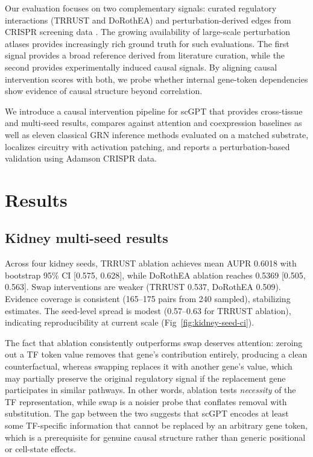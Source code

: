 \documentclass[10pt,letterpaper]{article}
\begin{document}
Our evaluation focuses on two complementary signals: curated regulatory
interactions (TRRUST and DoRothEA) and perturbation-derived edges from CRISPR
screening data \cite{dixit_perturbseq_2016,datlinger_perturbseq_2017}. The
growing availability of large-scale perturbation atlases
\cite{replogle_perturbseq_2022,norman_crispr_2019} provides increasingly rich
ground truth for such evaluations. The first signal provides a broad reference
derived from literature curation, while the second provides experimentally
induced causal signals. By aligning causal intervention scores with both, we
probe whether internal gene-token dependencies show evidence of causal
structure beyond correlation.

We introduce a causal intervention pipeline for scGPT that provides
cross-tissue and multi-seed results, compares against attention and
coexpression baselines as well as eleven classical GRN inference methods
evaluated on a matched substrate, localizes circuitry with activation
patching, and reports a perturbation-based validation using Adamson
CRISPR data.


\section*{Results}

\subsection*{Kidney multi-seed results}

Across four kidney seeds, TRRUST ablation achieves mean AUPR 0.6018 with
bootstrap 95\% CI [0.575, 0.628], while DoRothEA ablation reaches 0.5369
[0.505, 0.563]. Swap interventions are weaker (TRRUST 0.537, DoRothEA 0.509).
Evidence coverage is consistent (165--175 pairs from 240 sampled), stabilizing
estimates. The seed-level spread is modest (0.57--0.63 for TRRUST ablation),
indicating reproducibility at current scale (Fig~\ref{fig:kidney-seed-ci}).

The fact that ablation consistently outperforms swap deserves attention: zeroing
out a TF token value removes that gene's contribution entirely, producing a
clean counterfactual, whereas swapping replaces it with another gene's value,
which may partially preserve the original regulatory signal if the replacement
gene participates in similar pathways. In other words, ablation tests
\textit{necessity} of the TF representation, while swap is a noisier probe that
conflates removal with substitution. The gap between the two suggests that
scGPT encodes at least some TF-specific information that cannot be replaced by
an arbitrary gene token, which is a prerequisite for genuine causal structure
rather than generic positional or cell-state effects.
\end{document}

